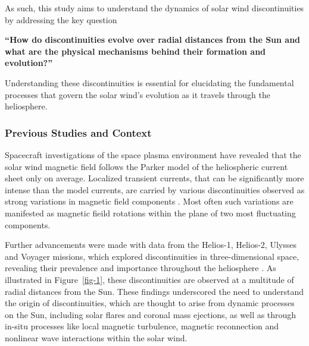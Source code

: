 \documentclass[
  letterpaper,
  DIV=11,
  numbers=noendperiod]{scrartcl}
\begin{document}
As such, this study aims to understand the dynamics of solar wind discontinuities by addressing the key question

\textbf{``How do discontinuities evolve over radial distances from the Sun and what are the physical mechanisms behind their formation and evolution?''}

Understanding these discontinuities is essential for elucidating the fundamental processes that govern the solar wind's evolution as it travels through the heliosphere.

\subsubsection{Previous Studies and Context}\label{previous-studies-and-context}

Spacecraft investigations of the space plasma environment have revealed that the solar wind magnetic field follows the Parker model of the heliospheric current sheet only on average. Localized transient currents, that can be significantly more intense than the model currents, are carried by various discontinuities observed as strong variations in magnetic field components \citep{colburnDiscontinuitiesSolarWind1966, burlagaMicroscaleStructuresInterplanetary1968, turnerOrientationsRotationalTangential1971}. Most often such variations are manifested as magnetic fieild rotations within the plane of two most fluctuating components.

Further advancements were made with data from the Helios-1, Helios-2, Ulysses and Voyager missions, which explored discontinuities in three-dimensional space, revealing their prevalence and importance throughout the heliosphere \citep{marianiStatisticalStudyMagnetohydrodynamic1983, tsurutaniNonlinearElectromagneticWaves1997}. As illustrated in Figure~\ref{fig-1}, these discontinuities are observed at a multitude of radial distances from the Sun. These findings underscored the need to understand the origin of discontinuities, which are thought to arise from dynamic processes on the Sun, including solar flares and coronal mass ejections, as well as through in-situ processes like local magnetic turbulence, magnetic reconnection and nonlinear wave interactions within the solar wind.
\end{document}
